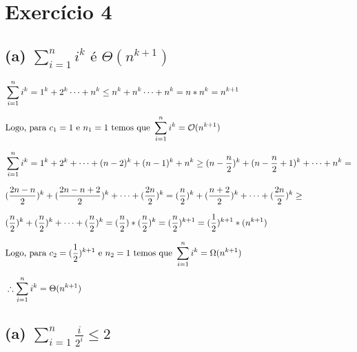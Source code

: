 \section*{Exercício 4}
\subsection*{(a) $\sum^{n}_{i=1} i^k \text{ é } \Theta(n^{k + 1})$}

\begin{equation*}
  \setlength{\jot}{10pt}
  \begin{aligned}
    &\sum^{n}_{i=1} i^k = 1^k + 2^k \dots + n^k \leq n^k + n^k \dots + n^k = n*n^k = n^{k+1} \\
    &\text{Logo, para $c_1 = 1$ e $n_1 = 1$ temos que } \sum^{n}_{i=1} i^k = \bigO(n^{k+1}) \\
    &\sum^{n}_{i=1} i^k = 1^k + 2^k + \dots + (n-2)^k + (n-1)^k + n^k \geq (n-\frac{n}{2})^k + (n-\frac{n}{2}+1)^k + \dots + n^k = \\
    &(\frac{2n-n}{2})^k + (\frac{2n-n+2}{2})^k + \dots + (\frac{2n}{2})^k = (\frac{n}{2})^k + (\frac{n+2}{2})^k + \dots + (\frac{2n}{2})^k \geq \\
    &(\frac{n}{2})^k + (\frac{n}{2})^k + \dots + (\frac{n}{2})^k = (\frac{n}{2})*(\frac{n}{2})^k = (\frac{n}{2})^{k+1} = (\frac{1}{2})^{k+1}*(n^{k+1}) \\
    &\text{Logo, para $c_2 = (\frac{1}{2})^{k+1}$ e $n_2 = 1$ temos que } \sum^{n}_{i=1} i^k = \Omega(n^{k+1}) \\
    &\therefore \sum^{n}_{i=1} i^k = \Theta(n^{k + 1})
\end{aligned}\end{equation*}

\subsection*{(a) $\sum^{n}_{i=1} \frac{i}{2^i} \leq 2$}

